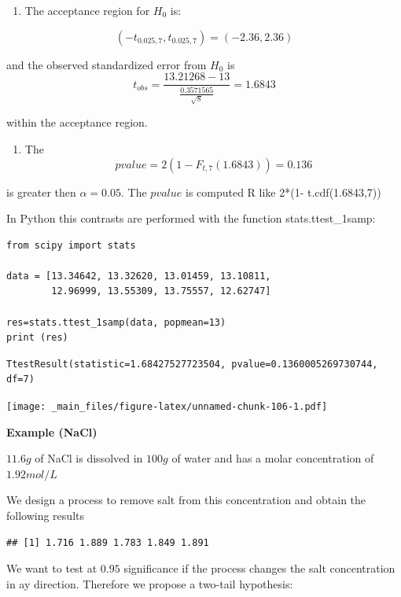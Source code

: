 \documentclass[
]{book}
\providecommand{\tightlist}{%
  \setlength{\itemsep}{0pt}\setlength{\parskip}{0pt}}
\begin{document}
\begin{enumerate}
\def\labelenumi{\arabic{enumi}.}
\setcounter{enumi}{1}
\tightlist
\item
  The acceptance region for \(H_0\) is:
\end{enumerate}

\[(-t_{0.025,7}, t_{0.025,7})=( -2.36,  2.36)\]

and the observed standardized error from \(H_0\) is
\[t_{obs} =  \frac{13.21268-13}{\frac{0.3571565}{\sqrt{8}}}=1.6843\]

within the acceptance region.

\begin{enumerate}
\def\labelenumi{\arabic{enumi}.}
\setcounter{enumi}{2}
\tightlist
\item
  The \[pvalue=2(1-F_{t,7}(1.6843))=0.136\]
\end{enumerate}

is greater then \(\alpha=0.05\). The \(pvalue\) is computed R like 2*(1- t.cdf(1.6843,7))

In Python this contrasts are performed with the function stats.ttest\_1samp:

\begin{verbatim}
from scipy import stats

data = [13.34642, 13.32620, 13.01459, 13.10811, 
        12.96999, 13.55309, 13.75557, 12.62747]

res=stats.ttest_1samp(data, popmean=13)
print (res)
\end{verbatim}

\begin{verbatim}
TtestResult(statistic=1.68427527723504, pvalue=0.1360005269730744, df=7)
\end{verbatim}

\texttt{[image: \_main\_files/figure-latex/unnamed-chunk-106-1.pdf]}

\textbf{Example (NaCl)}

\(11.6g\) of NaCl is dissolved in \(100 g\) of water and has a molar concentration of \(1.92 mol/L\)

We design a process to remove salt from this concentration and obtain the following results

\begin{verbatim}
## [1] 1.716 1.889 1.783 1.849 1.891
\end{verbatim}

We want to test at \(0.95\) significance if the process changes the salt concentration in ay direction. Therefore we propose a two-tail hypothesis:
\end{document}

